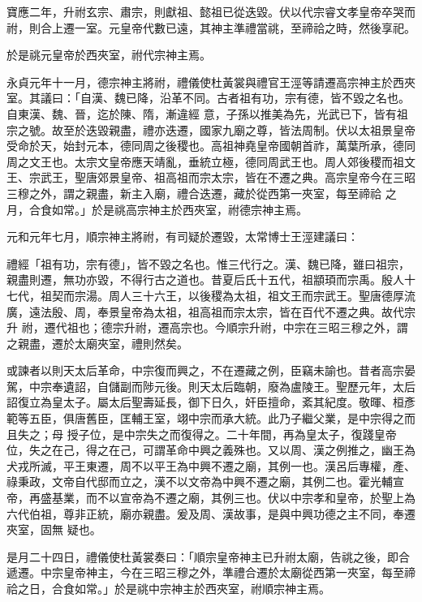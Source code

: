 \begin{pinyinscope}
 寶應二年，升祔玄宗、肅宗，則獻祖、懿祖已從迭毀。伏以代宗睿文孝皇帝卒哭而祔，則合上遷一室。元皇帝代數已遠，其神主準禮當祧，至禘祫之時，然後享祀。



 於是祧元皇帝於西夾室，祔代宗神主焉。



 永貞元年十一月，德宗神主將祔，禮儀使杜黃裳與禮官王涇等請遷高宗神主於西夾室。其議曰：「自漢、魏已降，沿革不同。古者祖有功，宗有德，皆不毀之名也。自東漢、魏、晉，迄於陳、隋，漸違經
 意，子孫以推美為先，光武已下，皆有祖宗之號。故至於迭毀親盡，禮亦迭遷，國家九廟之尊，皆法周制。伏以太祖景皇帝受命於天，始封元本，德同周之後稷也。高祖神堯皇帝國朝首祚，萬葉所承，德同周之文王也。太宗文皇帝應天靖亂，垂統立極，德同周武王也。周人郊後稷而祖文王、宗武王，聖唐郊景皇帝、祖高祖而宗太宗，皆在不遷之典。高宗皇帝今在三昭三穆之外，謂之親盡，新主入廟，禮合迭遷，藏於從西第一夾室，每至禘祫
 之月，合食如常。」於是祧高宗神主於西夾室，祔德宗神主焉。



 元和元年七月，順宗神主將祔，有司疑於遷毀，太常博士王涇建議曰：



 禮經「祖有功，宗有德」，皆不毀之名也。惟三代行之。漢、魏已降，雖曰祖宗，親盡則遷，無功亦毀，不得行古之道也。昔夏后氏十五代，祖顓頊而宗禹。殷人十七代，祖契而宗湯。周人三十六王，以後稷為太祖，祖文王而宗武王。聖唐德厚流廣，遠法殷、周，奉景皇帝為太祖，祖高祖而宗太宗，皆在百代不遷之典。故代宗升
 祔，遷代祖也；德宗升祔，遷高宗也。今順宗升祔，中宗在三昭三穆之外，謂之親盡，遷於太廟夾室，禮則然矣。



 或諫者以則天太后革命，中宗復而興之，不在遷藏之例，臣竊未諭也。昔者高宗晏駕，中宗奉遺詔，自儲副而陟元後。則天太后臨朝，廢為盧陵王。聖歷元年，太后詔復立為皇太子。屬太后聖壽延長，御下日久，奸臣擅命，紊其紀度。敬暉、桓彥範等五臣，俱唐舊臣，匡輔王室，翊中宗而承大統。此乃子繼父業，是中宗得之而且失之；母
 授子位，是中宗失之而復得之。二十年間，再為皇太子，復踐皇帝位，失之在己，得之在己，可謂革命中興之義殊也。又以周、漢之例推之，幽王為犬戎所滅，平王東遷，周不以平王為中興不遷之廟，其例一也。漢呂后專權，產、祿秉政，文帝自代邸而立之，漢不以文帝為中興不遷之廟，其例二也。霍光輔宣帝，再盛基業，而不以宣帝為不遷之廟，其例三也。伏以中宗孝和皇帝，於聖上為六代伯祖，尊非正統，廟亦親盡。爰及周、漢故事，是與中興功德之主不同，奉遷夾室，固無
 疑也。



 是月二十四日，禮儀使杜黃裳奏曰：「順宗皇帝神主已升祔太廟，告祧之後，即合遞遷。中宗皇帝神主，今在三昭三穆之外，準禮合遷於太廟從西第一夾室，每至禘祫之日，合食如常。」於是祧中宗神主於西夾室，祔順宗神主焉。




\end{pinyinscope}
